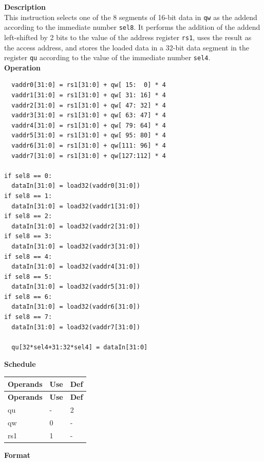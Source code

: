 \textbf{Description}\\
This instruction selects one of the 8 segments of 16-bit data in \lstinline{qw} as the addend according to the immediate number \lstinline{sel8}. It performs the addition of the addend left-shifted by 2 bits to the value of the address register \lstinline{rs1}, uses the result as the access address, and stores the loaded data in a 32-bit data segment in the register \lstinline{qu} according to the value of the immediate number \lstinline{sel4}. \\
\textbf{Operation}
\begin{lstlisting}
  vaddr0[31:0] = rs1[31:0] + qw[ 15:  0] * 4
  vaddr1[31:0] = rs1[31:0] + qw[ 31: 16] * 4
  vaddr2[31:0] = rs1[31:0] + qw[ 47: 32] * 4
  vaddr3[31:0] = rs1[31:0] + qw[ 63: 47] * 4
  vaddr4[31:0] = rs1[31:0] + qw[ 79: 64] * 4
  vaddr5[31:0] = rs1[31:0] + qw[ 95: 80] * 4
  vaddr6[31:0] = rs1[31:0] + qw[111: 96] * 4
  vaddr7[31:0] = rs1[31:0] + qw[127:112] * 4

if sel8 == 0:
  dataIn[31:0] = load32(vaddr0[31:0])
if sel8 == 1:
  dataIn[31:0] = load32(vaddr1[31:0])
if sel8 == 2:
  dataIn[31:0] = load32(vaddr2[31:0])
if sel8 == 3:
  dataIn[31:0] = load32(vaddr3[31:0])
if sel8 == 4:
  dataIn[31:0] = load32(vaddr4[31:0])
if sel8 == 5:
  dataIn[31:0] = load32(vaddr5[31:0])
if sel8 == 6:
  dataIn[31:0] = load32(vaddr6[31:0])
if sel8 == 7:
  dataIn[31:0] = load32(vaddr7[31:0])

  qu[32*sel4+31:32*sel4] = dataIn[31:0]
\end{lstlisting}

\textbf{Schedule}\\
\begin{longtable}[c]{|l|l|l|}
    \hline
    \rowcolor{lightgray}
    \textbf{Operands} & \textbf{Use} & \textbf{Def} \\\hline
    \endfirsthead
    \hline
    \rowcolor{lightgray}
     \textbf{Operands} & \textbf{Use} & \textbf{Def} \\\hline
    \endhead
    \hline
    \endfoot

  qu & - & 2 \\\hline
  qw & 0 & - \\\hline
  rs1 & 1 & -

\end{longtable}

\textbf{Format}\\

